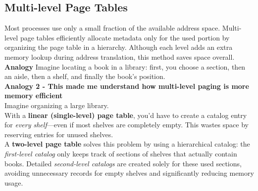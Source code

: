 \documentclass[../../compsys.tex]{subfiles}
\begin{document}
\subsection{Multi-level Page Tables}
\small
Most processes use only a small fraction of the available address space. Multi-level page tables efficiently allocate metadata only for the used portion by organizing the page table in a hierarchy. Although each level adds an extra memory lookup during address translation, this method saves space overall. \\[5px]
\textbf{Analogy} Imagine locating a book in a library: first, you choose a section, then an aisle, then a shelf, and finally the book's position. \\[5px]
\textbf{Analogy 2  - This made me understand how multi-level paging is more memory efficient}\\
Imagine organizing a large library. \\[4px]
With a \textbf{linear (single-level) page table}, you'd have to create a catalog entry for \textit{every shelf}—even if most shelves are completely empty. This wastes space by reserving entries for unused shelves. \\[4px]
A \textbf{two-level page table} solves this problem by using a hierarchical catalog: the \textit{first-level catalog} only keeps track of sections of shelves that actually contain books. Detailed \textit{second-level catalogs} are created solely for these used sections, avoiding unnecessary records for empty shelves and significantly reducing memory usage.\\
\end{document}
